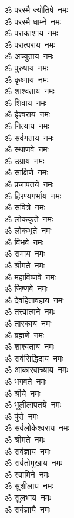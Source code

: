 \begin{multicols}{2}
\begin{flushleft}
ॐ परस्मै ज्योतिषे~नमः\\
ॐ परस्मै धाम्ने~नमः\\
ॐ पराकाशाय~नमः\\
ॐ परात्पराय~नमः\\
ॐ अच्युताय~नमः\\
ॐ पुरुषाय~नमः\\
ॐ कृष्णाय~नमः\hfill{}\\
ॐ शाश्वताय~नमः\\
ॐ शिवाय~नमः\\
ॐ ईश्वराय~नमः\\
ॐ नित्याय~नमः\\
ॐ सर्वगताय~नमः\\
ॐ स्थाणवे~नमः\\
ॐ उग्राय~नमः\\
ॐ साक्षिणे~नमः\\
ॐ प्रजापतये~नमः\\
ॐ हिरण्यगर्भाय~नमः\hfill{}\\
ॐ सवित्रे~नमः\\
ॐ लोककृते~नमः\\
ॐ लोकभृते~नमः\\
ॐ विभवे~नमः\\
ॐ रामाय~नमः\\
ॐ श्रीमते~नमः\\
ॐ महाविष्णवे~नमः\\
ॐ जिष्णवे~नमः\\
ॐ देवहितावहाय~नमः\\
ॐ तत्त्वात्मने~नमः\hfill{}\\
ॐ तारकाय~नमः\\
ॐ ब्रह्मणे~नमः\\
ॐ शाश्वताय~नमः\\
ॐ सर्वसिद्धिदाय~नमः\\
ॐ आकारवाच्याय~नमः\\
ॐ भगवते~नमः\\
ॐ श्रीये~नमः\\
ॐ भूलीलापतये~नमः\\
ॐ पुंसे~नमः\\
ॐ सर्वलोकेश्वराय~नमः\hfill{}\\
ॐ श्रीमते~नमः\\
ॐ सर्वज्ञाय~नमः\\
ॐ सर्वतोमुखाय~नमः\\
ॐ स्वामिने~नमः\\
ॐ सुशीलाय~नमः\\
ॐ सुलभाय~नमः\\
ॐ सर्वज्ञायै~नमः\\

\end{flushleft}
\end{multicols}
